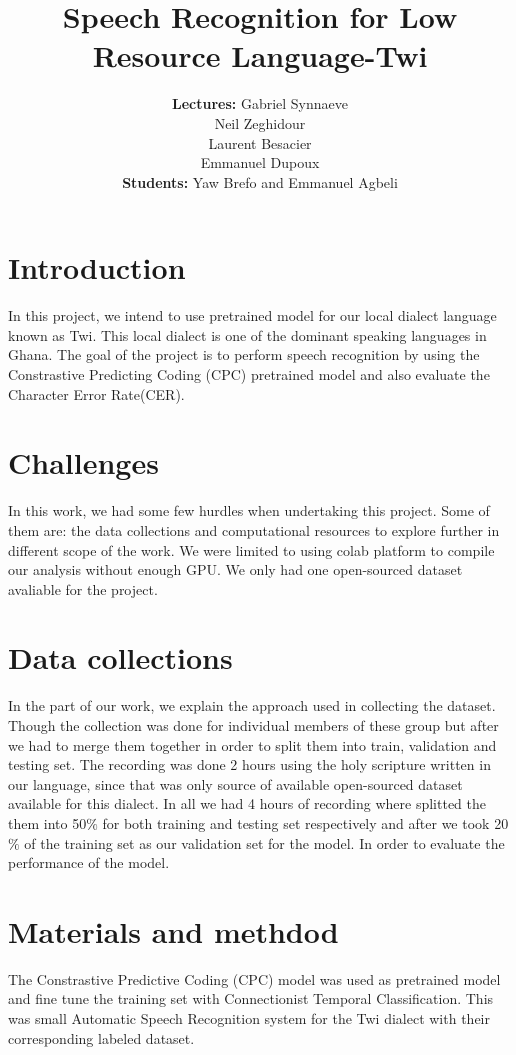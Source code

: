 \documentclass[10pt,a4paper]{article}
\title{Speech Recognition for Low Resource Language-Twi}
\author{\textbf{Lectures:} Gabriel Synnaeve \\ Neil Zeghidour \\ Laurent Besacier \\ Emmanuel Dupoux \\  \textbf{Students:} Yaw Brefo and  Emmanuel Agbeli}
\begin{document}
\maketitle	
\section{Introduction}

In this project, we intend to use pretrained model for our local dialect language known as Twi. This local dialect is one of the dominant speaking languages in Ghana. The goal of the project is to perform speech recognition by using the Constrastive Predicting Coding (CPC) pretrained model and also evaluate the Character Error Rate(CER). 


\section{Challenges}

In this work, we had some few hurdles when undertaking this project. Some of them are: the data collections and computational resources to explore further in different scope of the work. We were limited to using colab platform to compile our analysis without enough GPU. We only had one open-sourced dataset avaliable for the project. 

\section{Data collections}

In the part of our work, we explain the approach used in collecting the dataset. Though the collection was done for individual members of these group but after we had to merge them together in order to split them into train, validation and testing set. The recording was done 2 hours using the holy scripture written in our language, since that was only source of available open-sourced dataset available for this dialect.  In all we had 4 hours of recording where splitted the them into 50$\%$ for both training and testing set respectively and after we took 20 $\%$ of the training set as our validation set for the model. In order to evaluate the performance of the model. 


\section{Materials and methdod}

The Constrastive Predictive Coding (CPC) model was used as pretrained model and fine tune the training set with Connectionist Temporal Classification. This was small Automatic Speech Recognition system for the Twi dialect with their corresponding labeled dataset. 
\end{document}
